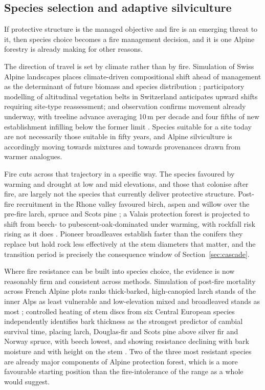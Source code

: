 \documentclass[11pt,a4paper]{article}
\begin{document}
\subsection{Species selection and adaptive silviculture}

If protective structure is the managed objective and fire is an emerging threat to it, then species choice becomes a fire management decision, and it is one Alpine forestry is already making for other reasons.

The direction of travel is set by climate rather than by fire. Simulation of Swiss Alpine landscapes places climate-driven compositional shift ahead of management as the determinant of future biomass and species distribution \citep{schumacher_relative_2006}; participatory modelling of altitudinal vegetation belts in Switzerland anticipates upward shifts requiring site-type reassessment; and observation confirms movement already underway, with treeline advance averaging 10\,m per decade and four fifths of new establishment infilling below the former limit \citep{frei_evidence_2023}. Species suitable for a site today are not necessarily those suitable in fifty years, and Alpine silviculture is accordingly moving towards mixtures and towards provenances drawn from warmer analogues.

Fire cuts across that trajectory in a specific way. The species favoured by warming and drought at low and mid elevations, and those that colonise after fire, are largely not the species that currently deliver protective structure. Post-fire recruitment in the Rhone valley favoured birch, aspen and willow over the pre-fire larch, spruce and Scots pine \citep{moser_potential_2010}; a Valais protection forest is projected to shift from beech- to pubescent-oak-dominated under warming, with rockfall risk rising as it does \citep{moos_climate_2021}. Pioneer broadleaves establish faster than the conifers they replace but hold rock less effectively at the stem diameters that matter, and the transition period is precisely the consequence window of Section~\ref{sec:cascade}.

Where fire resistance can be built into species choice, the evidence is now reasonably firm and consistent across methods. Simulation of post-fire mortality across French Alpine plots ranks thick-barked, high-canopied larch stands of the inner Alps as least vulnerable and low-elevation mixed and broadleaved stands as most \citep{dupire_vulnerability_2019}; controlled heating of stem discs from six Central European species independently identifies bark thickness as the strongest predictor of cambial survival time, placing larch, Douglas-fir and Scots pine above silver fir and Norway spruce, with beech lowest, and showing resistance declining with bark moisture and with height on the stem \citep{mutterer_bark_2026}. Two of the three most resistant species are already major components of Alpine protection forest, which is a more favourable starting position than the fire-intolerance of the range as a whole would suggest.
\end{document}
